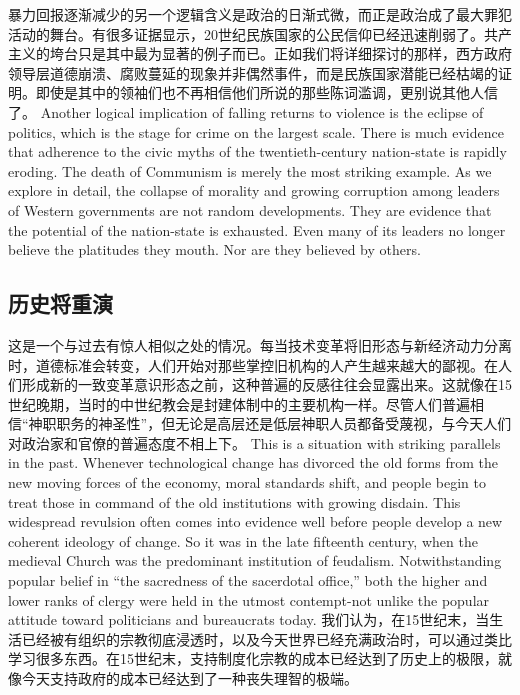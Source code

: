 \begin{paracol}{2}[]
\switchcolumn*
暴力回报逐渐减少的另一个逻辑含义是政治的日渐式微，而正是政治成了最大罪犯活动的舞台。有很多证据显示，20世纪民族国家的公民信仰已经迅速削弱了。共产主义的垮台只是其中最为显著的例子而已。正如我们将详细探讨的那样，西方政府领导层道德崩溃、腐败蔓延的现象并非偶然事件，而是民族国家潜能已经枯竭的证明。即使是其中的领袖们也不再相信他们所说的那些陈词滥调，更别说其他人信了。
\switchcolumn
Another logical implication of falling returns to violence is the eclipse of politics, which is the stage for crime on the largest scale. There is much evidence that adherence to the civic myths of the twentieth-century nation-state is rapidly eroding. The death of Communism is merely the most striking example. As we explore in detail, the collapse of morality and growing corruption among leaders of Western governments are not random developments. They are evidence that the potential of the nation-state is exhausted. Even many of its leaders no longer believe the platitudes they mouth. Nor are they believed by others.
\end{paracol}

\subsection{历史将重演} 
\begin{paracol}{2}[]
这是一个与过去有惊人相似之处的情况。每当技术变革将旧形态与新经济动力分离时，道德标准会转变，人们开始对那些掌控旧机构的人产生越来越大的鄙视。在人们形成新的一致变革意识形态之前，这种普遍的反感往往会显露出来。这就像在15世纪晚期，当时的中世纪教会是封建体制中的主要机构一样。尽管人们普遍相信“神职职务的神圣性”，但无论是高层还是低层神职人员都备受蔑视，与今天人们对政治家和官僚的普遍态度不相上下。
\switchcolumn
This is a situation with striking parallels in the past. Whenever technological change has divorced the old forms from the new moving forces of the economy, moral standards shift, and people begin to treat those in command of the old institutions with growing disdain. This widespread revulsion often comes into evidence well before people develop a new coherent ideology of change. So it was in the late fifteenth century, when the medieval Church was the predominant institution of feudalism. Notwithstanding popular belief in “the sacredness of the sacerdotal office,” both the higher and lower ranks of clergy were held in the utmost contempt-not unlike the popular attitude toward politicians and bureaucrats today.
\switchcolumn*
我们认为，在15世纪末，当生活已经被有组织的宗教彻底浸透时，以及今天世界已经充满政治时，可以通过类比学习很多东西。在15世纪末，支持制度化宗教的成本已经达到了历史上的极限，就像今天支持政府的成本已经达到了一种丧失理智的极端。
\switchcolumn
{}
\end{paracol}

